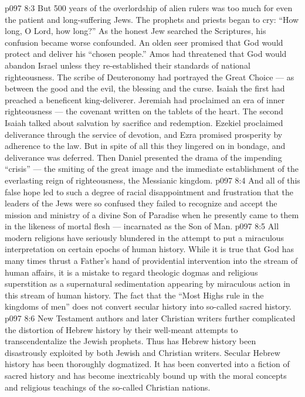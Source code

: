 \vs p097 8:3 But 500 years of the overlordship of alien rulers was too much for even the patient and long\hyp{}suffering Jews. The prophets and priests began to cry: “How long, O Lord, how long?” As the honest Jew searched the Scriptures, his confusion became worse confounded. An olden seer promised that God would protect and deliver his “chosen people.” Amos had threatened that God would abandon Israel unless they re\hyp{}established their standards of national righteousness. The scribe of Deuteronomy had portrayed the Great Choice --- as between the good and the evil, the blessing and the curse. Isaiah the first had preached a beneficent king\hyp{}deliverer. Jeremiah had proclaimed an era of inner righteousness --- the covenant written on the tablets of the heart. The second Isaiah talked about salvation by sacrifice and redemption. Ezekiel proclaimed deliverance through the service of devotion, and Ezra promised prosperity by adherence to the law. But in spite of all this they lingered on in bondage, and deliverance was deferred. Then Daniel presented the drama of the impending “crisis” --- the smiting of the great image and the immediate establishment of the everlasting reign of righteousness, the Messianic kingdom.
\vs p097 8:4 And all of this false hope led to such a degree of racial disappointment and frustration that the leaders of the Jews were so confused they failed to recognize and accept the mission and ministry of a divine Son of Paradise when he presently came to them in the likeness of mortal flesh --- incarnated as the Son of Man.
\vs p097 8:5 \pc All modern religions have seriously blundered in the attempt to put a miraculous interpretation on certain epochs of human history. While it is true that God has many times thrust a Father’s hand of providential intervention into the stream of human affairs, it is a mistake to regard theologic dogmas and religious superstition as a supernatural sedimentation appearing by miraculous action in this stream of human history. The fact that the “Most Highs rule in the kingdoms of men” does not convert secular history into so\hyp{}called sacred history.
\vs p097 8:6 New Testament authors and later Christian writers further complicated the distortion of Hebrew history by their well\hyp{}meant attempts to transcendentalize the Jewish prophets. Thus has Hebrew history been disastrously exploited by both Jewish and Christian writers. Secular Hebrew history has been thoroughly dogmatized. It has been converted into a fiction of sacred history and has become inextricably bound up with the moral concepts and religious teachings of the so\hyp{}called Christian nations.
